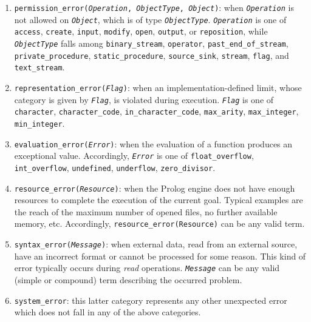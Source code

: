 \begin{enumerate}
  \item \texttt{permission\_error(\textit{Operation}, \textit{ObjectType}, \textit{Object})}:
      when \texttt{\textit{Operation}} is not allowed on \texttt{\textit{Object}}, which is of
      type \texttt{\textit{ObjectType}}. \texttt{\textit{Operation}} is one of
      \texttt{access}, \texttt{create}, \texttt{input}, \texttt{modify}, \texttt{open},
      \texttt{output}, or \texttt{reposition}, while \texttt{\textit{ObjectType}} falls among
      \texttt{binary\_stream}, \texttt{operator}, \texttt{past\_end\_of\_stream},
      \texttt{private\_procedure}, \texttt{static\_procedure}, \texttt{source\_sink},
      \texttt{stream}, \texttt{flag}, and \texttt{text\_stream}.

  \item \texttt{representation\_error(\textit{Flag})}: when an implementation-defined limit,
      whose category is given by \texttt{\textit{Flag}}, is violated during execution.
      \texttt{\textit{Flag}} is one of \texttt{character}, \texttt{character\_code},
      \texttt{in\_character\_code}, \texttt{max\_arity}, \texttt{max\_integer},
      \texttt{min\_integer}.

  \item \texttt{evaluation\_error(\textit{Error})}: when the evaluation of a function produces
      an exceptional value. Accordingly, \texttt{\textit{Error}} is one of
      \texttt{float\_overflow}, \texttt{int\_overflow}, \texttt{undefined},
      \texttt{underflow}, \texttt{zero\_divisor}.

  \item \texttt{resource\_error(\textit{Resource})}: when the Prolog engine does not have
      enough resources to complete the execution of the current goal. Typical examples are the
      reach of the maximum number of opened files, no further available memory, etc.
      Accordingly, \texttt{resource\_error(Resource)} can be any valid term.

  \item \texttt{syntax\_error(\textit{Message})}: when external data, read from an external
      source, have an incorrect format or cannot be processed for some reason. This kind of
      error typically occurs during \textit{read} operations. \texttt{\textit{Message}} can be
      any valid (simple or compound) term describing the occurred problem.

  \item \texttt{system\_error}: this latter category represents any other unexpected error
      which does not fall in any of the above categories.
\end{enumerate}

